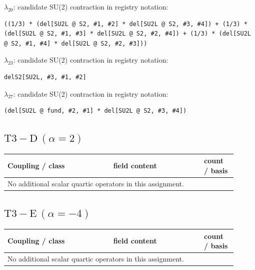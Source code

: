 \documentclass[9pt,a4paper]{article}
\begin{document}
\textbf{$ \lambda_{20} $}: candidate SU(2) contraction in registry notation:
\begin{lstlisting}[mathescape=true]
((1/3) * (del[SU2L @ S2, #1, #2] * del[SU2L @ S2, #3, #4]) + (1/3) * (del[SU2L @ S2, #1, #3] * del[SU2L @ S2, #2, #4]) + (1/3) * (del[SU2L @ S2, #1, #4] * del[SU2L @ S2, #2, #3]))
\end{lstlisting}

\textbf{$ \lambda_{23} $}: candidate SU(2) contraction in registry notation:
\begin{lstlisting}[mathescape=true]
delS2[SU2L, #3, #1, #2]
\end{lstlisting}

\textbf{$ \lambda_{27} $}: candidate SU(2) contraction in registry notation:
\begin{lstlisting}[mathescape=true]
(del[SU2L @ fund, #2, #1] * del[SU2L @ S2, #3, #4])
\end{lstlisting}

\subsection*{$ \mathrm{T3-D}\,(\alpha=2) $}
\begin{longtable}{@{}p{0.42\linewidth}p{0.36\linewidth}p{0.13\linewidth}@{}}
\toprule
Coupling / class & field content & count / basis\\
\midrule
\endhead
\multicolumn{3}{l}{No additional scalar quartic operators in this assignment.}\\
\bottomrule
\end{longtable}
\subsection*{$ \mathrm{T3-E}\,(\alpha=-4) $}
\begin{longtable}{@{}p{0.42\linewidth}p{0.36\linewidth}p{0.13\linewidth}@{}}
\toprule
Coupling / class & field content & count / basis\\
\midrule
\endhead
\multicolumn{3}{l}{No additional scalar quartic operators in this assignment.}\\
\bottomrule
\end{longtable}
\end{document}
